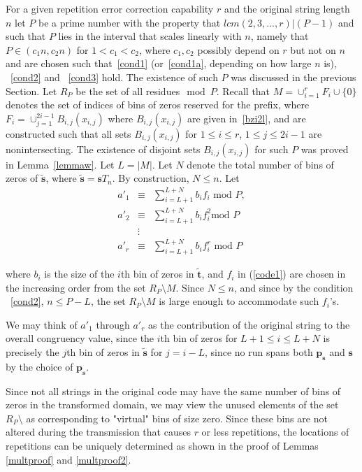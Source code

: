 \documentclass[12pt]{article} \pagestyle{plain} \topmargin
\begin{document}
For a given repetition error correction capability $r$ and the
original string length $n$ let $P$ be a prime number with the
property that $lcm(2,3,...,r)| (P-1)$ and such that $P$ lies in the
interval that scales linearly with $n$, namely that $P \in
(c_1n,c_2n)$ for $1 <c_1 < c_2$, where $c_1,c_2$ possibly depend on
$r$ but not on $n$ and are chosen such that~\eqref{cond1}
(or~\eqref{cond1a}, depending on how large $n$ is), ~\eqref{cond2}
and ~\eqref{cond3} hold. The existence of such $P$ was discussed in
the previous Section. Let $R_P$ be the set of all residues$\mod P$.
Recall that $M=\cup_{i=1}^r F_i \cup \{0\}$ denotes the set of
indices of bins of zeros reserved for the prefix, where $F_i =
\cup_{j=1}^{2i-1} B_{i,j}(x_{i,j})$ where $B_{i,j}(x_{i,j})$ are
given in~\eqref{bzi2l}, and are constructed such that all sets
$B_{i,j}(x_{i,j})$ for $1 \leq i \leq r$, $1 \leq j \leq 2i-1$ are
nonintersecting. The existence of disjoint sets $B_{i,j}(x_{i,j})$
for such $P$ was proved in Lemma~\ref{lemmaw}. Let $L=|M|$. Let $N$
denote the total number of bins of zeros of $\tilde{\mathbf{s}}$,
where $\tilde{\mathbf{s}}=\mathbf{s}T_n$. By construction, $N \leq
n$.
 Let
\begin{equation}\label{code1}\begin{array}{ccc} {a'}_1 &\equiv& \sum_{i=L+1}^{L+N} b_i f_i
\text{ mod } P, \\ {a'}_2 &\equiv& \sum_{i=L+1}^{L+N} b_i f_i^2
\text{
mod } P\\ &\vdots& \\
{a'}_r &\equiv& \sum_{i=L+1}^{L+N} b_i f_i^r \text{ mod }
P\end{array}\end{equation}

where $b_i$ is the size of the $i$th bin of zeros in
$\tilde{\mathbf{t}}$, and $f_i$ in (\ref{code1}) are chosen in the
increasing order from the set $R_P\setminus M$. Since $N \leq n$,
and since by the condition ~\eqref{cond2},  $n \leq P-L$, the set
$R_P\setminus M$ is large enough to accommodate such $f_i$'s.

We may think of ${a'}_1$ through ${a'}_r$ as the contribution of the
original string  to the overall congruency value, since the $i$th
bin of zeros for $L+1 \leq i \leq L+N$ is precisely the $j$th bin of
zeros in $\tilde{\mathbf{s}}$ for $j=i-L$, since no run spans both
$\mathbf{p_s}$ and $\mathbf{s}$ by the choice of $\mathbf{p_s}$.

Since not all strings in the original code may have the same number
of bins of zeros in the transformed domain, we may view the unused
elements of the set $R_P \setminus$ as corresponding to "virtual"
bins of size zero. Since these bins are not altered during the
transmission that causes $r$ or less repetitions, the locations of
repetitions can be uniquely determined as shown in the proof of
Lemmas \ref{multproof} and \ref{multproof2}.
\end{document}
